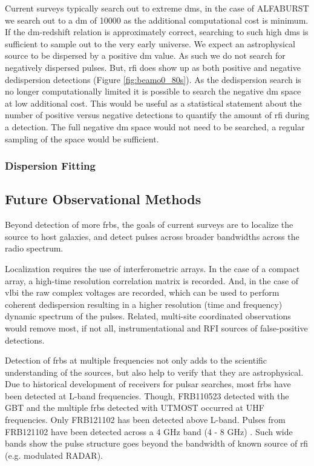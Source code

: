 \documentclass[a4paper,fleqn,usenatbib]{mnras}
\begin{document}
Current surveys typically search out to extreme \glspl{dm}, in the case of
ALFABURST we search out to a \gls{dm} of 10000 as the additional computational
cost is minimum. If the \gls{dm}-redshift relation is approximately correct,
searching to such high \glspl{dm} is sufficient to sample out to the very early
universe. We expect an astrophysical source to be dispersed by a positive
\gls{dm} value. As such we do not search for negatively dispersed pulses. But,
\gls{rfi} does show up as both positive and negative dedispersion detections
(Figure \ref{fig:beamo0_80s}). As the dedispersion search is no longer
computationally limited it is possible to search the negative \gls{dm} space at
low additional cost. This would be useful as a statistical statement about the
number of positive versus negative detections to quantify the amount of
\gls{rfi} during a detection. The full negative \gls{dm} space would not need to
be searched, a regular sampling of the space would be sufficient.

\subsubsection{Dispersion Fitting}


\subsection{Future Observational Methods}

Beyond detection of more \glspl{frb}, the goals of current surveys are to
localize the source to host galaxies, and detect pulses across broader
bandwidths across the radio spectrum.

Localization requires the use of interferometric arrays. In the case of a
compact array, a high-time resolution correlation matrix is recorded. And, in
the case of \gls{vlbi} the raw complex voltages are recorded, which can be used
to perform coherent dedispersion resulting in a higher resolution (time and
frequency) dynamic spectrum of the pulses.  Related, multi-site coordinated
observations would remove most, if not all, instrumentational and RFI sources of
false-positive detections.

Detection of \glspl{frb} at multiple frequencies not only adds to the scientific
understanding of the sources, but also help to verify that they are
astrophysical.  Due to historical development of receivers for pulsar searches,
most \glspl{frb} have been detected at L-band frequencies. Though, FRB110523
detected with the GBT and the multiple \glspl{frb} detected with UTMOST occurred
at UHF frequencies.  Only FRB121102 has been detected above L-band.  Pulses from
FRB121102 have been detected across a 4 GHz band (4 - 8 GHz) \citep{atel10675}.
Such wide bands show the pulse structure goes beyond the bandwidth of known
source of \gls{rfi} (e.g. modulated RADAR).
\end{document}
